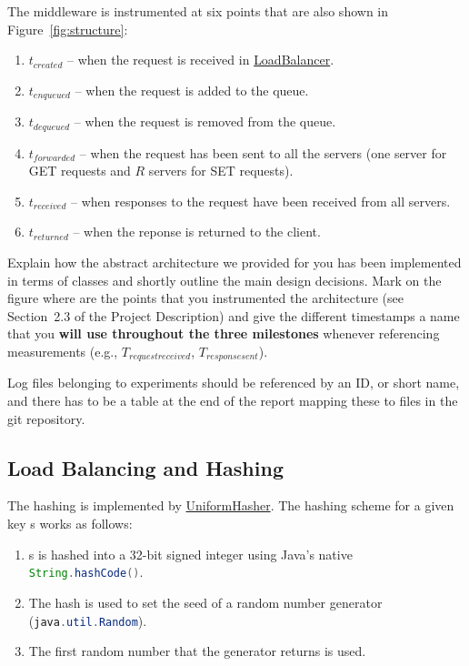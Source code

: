 \documentclass[11pt]{article}
\newcommand{\code}[1]{\lstinline[language=Java]{#1}}
\newcommand{\todo}[1]{\fcolorbox{black}{Apricot}{TODO: #1}}
\newcommand{\linkmain}[1]{\href{https://gitlab.inf.ethz.ch/pungast/asl-fall16-project/blob/master/src/main/java/asl/#1.java}{#1}}
\begin{document}
The middleware is instrumented at six points that are also shown in Figure~\ref{fig:structure}:
\begin{enumerate}
\item $t_{created}$ -- when the request is received in \linkmain{LoadBalancer}.
\item $t_{enqueued}$ -- when the request is added to the queue.
\item $t_{dequeued}$ -- when the request is removed from the queue.
\item $t_{forwarded}$ -- when the request has been sent to all the servers (one server for GET requests and $R$ servers for SET requests).
\item $t_{received}$ -- when responses to the request have been received from all servers.
\item $t_{returned}$ -- when the reponse is returned to the client.
\end{enumerate}

\todo{}

Explain how the abstract architecture we provided for you has been implemented in terms of classes and shortly outline the main design decisions. Mark on the figure where are the points that you instrumented the architecture (see Section~2.3 of the Project Description) and give the different timestamps a name that you\textbf{ will use throughout the three milestones }whenever referencing measurements (e.g., $T_{requestreceived}$, $T_{responsesent}$).

Log files belonging to experiments should be referenced by an ID, or short name, and there has to be a table at the end of the report mapping these to files in the git repository.

\subsection{Load Balancing and Hashing}\label{sec:desc:hashing}

The hashing is implemented by \linkmain{UniformHasher}. The hashing scheme for a given key s works as follows:
\begin{enumerate}
\item s is hashed into a 32-bit signed integer using Java's native \code{String.hashCode()}.
\item The hash is used to set the seed of a random number generator (\code{java.util.Random}).
\item The first random number that the generator returns is used.
\end{enumerate}
\end{document}
